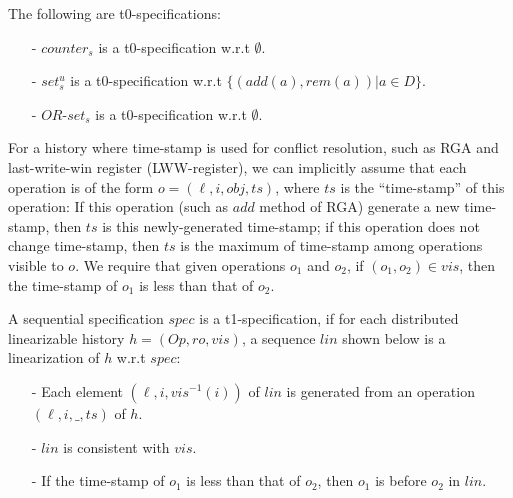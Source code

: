 \begin{lemma}
\label{lemma:several t0-specifications}
The following are t0-specifications:  

\begin{itemize}
\setlength{\itemsep}{0.5pt}
\item[-] $\mathit{counter}_s$ is a t0-specification w.r.t $\emptyset$. 

\item[-] $\mathit{set}_s^u$ is a t0-specification w.r.t $\{ (\mathit{add}(a),\mathit{rem}(a)) \vert a \in D \}$. 

\item[-] $\mathit{OR}$-$\mathit{set}_s$ is a t0-specification w.r.t $\emptyset$. 
\end{itemize}
\end{lemma} 

For a history where time-stamp is used for conflict resolution, such as RGA and last-write-win register (LWW-register), we can implicitly assume that each operation is of the form $o = (\ell,i,\mathit{obj},\mathit{ts})$, where $\mathit{ts}$ is the ``time-stamp'' of this operation: If this operation (such as $\mathit{add}$ method of RGA) generate a new time-stamp, then $\mathit{ts}$ is this newly-generated time-stamp; if this operation does not change time-stamp, then $\mathit{ts}$ is the maximum of time-stamp among operations visible to $o$. We require that given operations $o_1$ and $o_2$, if $(o_1,o_2) \in \mathit{vis}$, then the time-stamp of $o_1$ is less than that of $o_2$.


\begin{definition}[t1-specification]
\label{definition:t1-specification}
A sequential specification $\mathit{spec}$ is a t1-specification, if for each distributed linearizable history $h=(\mathit{Op},\mathit{ro},\mathit{vis})$, a sequence $\mathit{lin}$ shown below is a linearization of $h$ w.r.t $\mathit{spec}$:

\begin{itemize}
\setlength{\itemsep}{0.5pt}
\item[-] Each element $(\ell,i,\mathit{vis}^{-1}(i))$ of $\mathit{lin}$ is generated from an operation $(\ell,i,\_,\mathit{ts})$ of $h$. 

\item[-] $\mathit{lin}$ is consistent with $\mathit{vis}$. 

\item[-] If the time-stamp of $o_1$ is less than that of $o_2$, then $o_1$ is before $o_2$ in $\mathit{lin}$. 
\end{itemize}
\end{definition}



